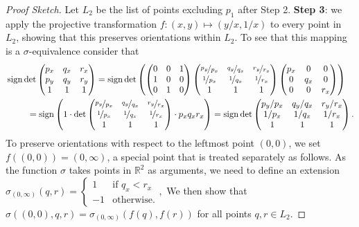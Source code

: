 \begin{proof}[Proof Sketch]
Let $L_2$ be the list of points excluding $p_1$ after Step 2.
\textbf{Step 3}: we apply the projective transformation $f: (x, y) \mapsto (y/x, 1/x)$ to every point in $L_2$,
showing that this preserves orientations within $L_2$.
To see that this mapping is a $\sigma$-equivalence consider that
\[
\begin{multlined}
 \sign \det \begin{pmatrix} p_x & q_x & r_x \\ p_y & q_y & r_y \\ 1 & 1 & 1 \end{pmatrix} =  \sign \det \left( \begin{pmatrix} 0 & 0 & 1 \\ 1 & 0 & 0\\ 0 & 1 & 0 \end{pmatrix}  \begin{pmatrix} \nicefrac{p_y}{p_x} & \nicefrac{q_y}{q_x} & \nicefrac{r_y}{r_x} \\ \nicefrac{1}{p_x} & \nicefrac{1}{q_x} & \nicefrac{1}{r_x} \\ 1 & 1 & 1 \end{pmatrix}  \begin{pmatrix} p_x & 0 & 0 \\ 0 & q_x & 0\\ 0 & 0 & r_x \end{pmatrix} \right)\\
                        = \sign \left(1 \cdot \det  \begin{pmatrix} \nicefrac{p_y}{p_x} & \nicefrac{q_y}{q_x} & \nicefrac{r_y}{r_x} \\ \nicefrac{1}{p_x} & \nicefrac{1}{q_x} & \nicefrac{1}{r_x} \\ 1 & 1 & 1 \end{pmatrix} \cdot  p_x q_x r_x  \right) = \sign \det \begin{pmatrix} p_y/p_x & q_y/q_x & r_y/r_x \\ 1/p_x & 1/q_x & 1/r_x \\ 1 & 1 & 1 \end{pmatrix}.
\end{multlined}
\]
To preserve orientations with respect to the leftmost point $(0, 0)$, we set $f( (0, 0)) = (0, \infty)$,
a special point that is treated separately as follows.
As the function $\sigma$ takes points in $\mathbb{R}^2$ as arguments,
we need to define an extension
\(
  \sigma_{(0, \infty)}(q, r) = \begin{cases}
    1 & \text{if } q_x < r_x \\
    -1 & \text{otherwise}.  
  \end{cases},
\)
We then show that $\sigma((0, 0), q, r) = \sigma_{(0, \infty)}(f(q), f(r))$ for all points $q, r \in L_2$. 


\end{proof}
